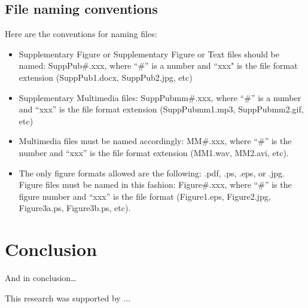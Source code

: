 \documentclass[reprint]{JASA}
\begin{document}
\subsection{File naming conventions}
Here are the conventions for naming files:

\begin{itemize}
\item
Supplementary Figure or
	Supplementary Figure or Text files should be named: SuppPub\#.xxx, where ``\#'' is
	a number and ``xxx" is the file format extension
	(SuppPub1.docx, SuppPub2.jpg, etc)

\item
	Supplementary Multimedia files: SuppPubmm\#.xxx, where ``\#'' is a
	number and ``xxx'' is the file format extension (SuppPubmm1.mp3,
	SuppPubmm2.gif, etc)

\item
Multimedia files must be named accordingly: MM\#.xxx, where ``\#'' is the
number and ``xxx'' is the file format extension (MM1.wav, MM2.avi, etc).

\item
The only figure formats allowed are the following: 
.pdf, .ps, .eps, or .jpg. Figure files must be named in this fashion:
Figure\#.xxx, where ``\#'' is the figure number and ``xxx'' is the file format
(Figure1.eps, Figure2.jpg, Figure3a.ps, Figure3b.ps, etc). 

\end{itemize}



\section{\label{sec:5}Conclusion}

And in conclusion\ldots

\begin{acknowledgments}
This research was supported by  ...
\end{acknowledgments}




\appendix
\end{document}
